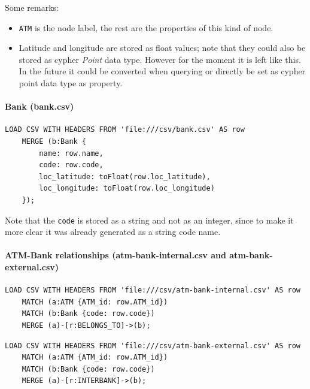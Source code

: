 \begin{itemize}
Some remarks:
\begin{itemize}
    \item \texttt{ATM} is the node label, the rest are the properties of this kind of node.
    \item Latitude and longitude are stored as float values; note that they could also be stored
    as cypher \textit{Point} data type. However for the moment it is left like this. In the future
    it could be converted when querying or directly be set as cypher point data type as property.
\end{itemize}

\paragraph{Bank (bank.csv)}

\begin{center}
\lstset{style=cypherStyle}
\begin{lstlisting}[caption={bank.csv}]
    LOAD CSV WITH HEADERS FROM 'file:///csv/bank.csv' AS row
    MERGE (b:Bank {
        name: row.name, 
        code: row.code, 
        loc_latitude: toFloat(row.loc_latitude), 
        loc_longitude: toFloat(row.loc_longitude)
    });
\end{lstlisting}
\end{center}

Note that the \texttt{code} is stored as a string and not as an integer, since to make it more clear it 
was already generated as a string code name.

\paragraph{ATM-Bank relationships (atm-bank-internal.csv and atm-bank-external.csv)}

\begin{center}
\lstset{style=cypherStyle}
\begin{lstlisting}[caption={atm-bank-internal.csv}]
    LOAD CSV WITH HEADERS FROM 'file:///csv/atm-bank-internal.csv' AS row
    MATCH (a:ATM {ATM_id: row.ATM_id})
    MATCH (b:Bank {code: row.code})
    MERGE (a)-[r:BELONGS_TO]->(b);
\end{lstlisting}
\end{center}

\begin{center}
\lstset{style=cypherStyle}
\begin{lstlisting}[caption={atm-bank-external.csv}]
    LOAD CSV WITH HEADERS FROM 'file:///csv/atm-bank-external.csv' AS row
    MATCH (a:ATM {ATM_id: row.ATM_id})
    MATCH (b:Bank {code: row.code})
    MERGE (a)-[r:INTERBANK]->(b);
\end{lstlisting}
\end{center}


\end{itemize}
